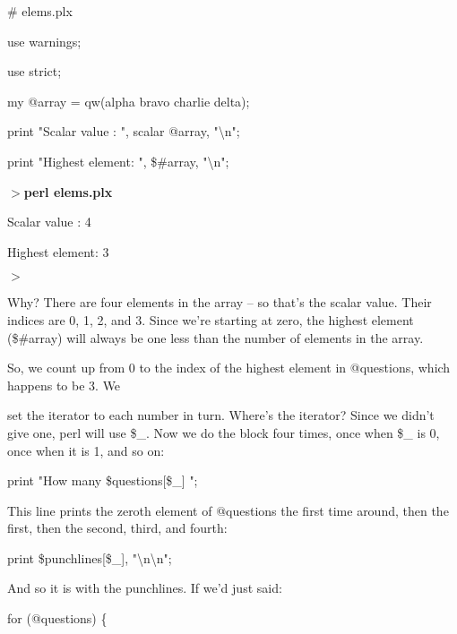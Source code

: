 \documentclass[a4paper,11pt]{book}
\begin{document}
\noindent \# elems.plx

\noindent use warnings;

\noindent use strict;

\noindent 

\noindent my @array = qw(alpha bravo charlie delta);

\noindent 

\noindent print "Scalar value : ", scalar @array, "\textbackslash n";

\noindent print "Highest element: ", \$\#array, "\textbackslash n";

\noindent 

\noindent 

\noindent $>$\textbf{perl elems.plx}

\noindent Scalar value : 4

\noindent Highest element: 3

\noindent $>$

\noindent 

\noindent Why? There are four elements in the array -- so that's the scalar value. Their indices are 0, 1, 2, and 3. Since we're starting at zero, the highest element (\$\#array) will always be one less than the number of elements in the array.

\noindent 

\noindent So, we count up from 0 to the index of the highest element in @questions, which happens to be 3. We

\noindent set the iterator to each number in turn. Where's the iterator? Since we didn't give one, perl will use \$\_. Now we do the block four times, once when \$\_ is 0, once when it is 1, and so on:

\noindent 

\noindent print "How many \$questions[\$\_] ";

\noindent 

\noindent This line prints the zeroth element of @questions the first time around, then the first, then the second, third, and fourth:

\noindent 

\noindent print \$punchlines[\$\_], "\textbackslash n\textbackslash n";

\noindent 

\noindent And so it is with the punchlines. If we'd just said:

\noindent 

\noindent 

\noindent for (@questions) \{
\end{document}
